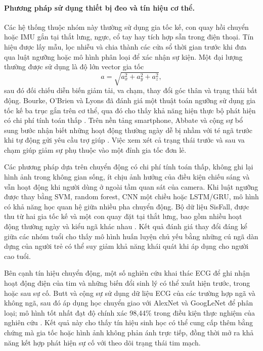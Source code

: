 \paragraph{Phương pháp sử dụng thiết bị đeo và tín hiệu cơ thể.}
Các hệ thống thuộc nhóm này thường sử dụng gia tốc kế, con quay hồi chuyển hoặc IMU gắn tại thắt lưng, ngực, cổ tay hay tích hợp sẵn trong điện thoại. Tín hiệu được lấy mẫu, lọc nhiễu và chia thành các cửa sổ thời gian trước khi đưa qua luật ngưỡng hoặc mô hình phân loại để xác nhận sự kiện. Một đại lượng thường được sử dụng là độ lớn vector gia tốc
\begin{equation}
a=\sqrt{a_x^2+a_y^2+a_z^2},
\end{equation}
sau đó đối chiếu diễn biến giảm tải, va chạm, thay đổi góc thân và trạng thái bất động. Bourke, O'Brien và Lyons đã đánh giá một thuật toán ngưỡng sử dụng gia tốc kế ba trục gắn trên cơ thể, qua đó cho thấy khả năng hiện thực bộ phát hiện có chi phí tính toán thấp . Trên nền tảng smartphone, Abbate và cộng sự bổ sung bước nhận biết những hoạt động thường ngày dễ bị nhầm với té ngã trước khi tự động gửi yêu cầu trợ giúp . Việc xem xét cả trạng thái trước và sau va chạm giúp giảm sự phụ thuộc vào một đỉnh gia tốc đơn lẻ.

Các phương pháp dựa trên chuyển động có chi phí tính toán thấp, không ghi lại hình ảnh trong không gian sống, ít chịu ảnh hưởng của điều kiện chiếu sáng và vẫn hoạt động khi người dùng ở ngoài tầm quan sát của camera. Khi luật ngưỡng được thay bằng SVM, random forest, CNN một chiều hoặc LSTM/GRU, mô hình có khả năng học quan hệ giữa nhiều pha chuyển động. Bộ dữ liệu SisFall, được thu từ hai gia tốc kế và một con quay đặt tại thắt lưng, bao gồm nhiều hoạt động thường ngày và kiểu ngã khác nhau . Kết quả đánh giá thay đổi đáng kể giữa các nhóm tuổi cho thấy mô hình huấn luyện chủ yếu bằng những cú ngã dàn dựng của người trẻ có thể suy giảm khả năng khái quát khi áp dụng cho người cao tuổi.

Bên cạnh tín hiệu chuyển động, một số nghiên cứu khai thác ECG để ghi nhận hoạt động điện của tim và những biến đổi sinh lý có thể xuất hiện trước, trong hoặc sau sự cố. Butt và cộng sự sử dụng dữ liệu ECG của các trường hợp ngã và không ngã, sau đó áp dụng học chuyển giao với AlexNet và GoogLeNet để phân loại; mô hình tốt nhất đạt độ chính xác 98,44\% trong điều kiện thực nghiệm của nghiên cứu . Kết quả này cho thấy tín hiệu sinh học có thể cung cấp thêm bằng chứng mà gia tốc hoặc hình ảnh không phản ánh trực tiếp, đồng thời mở ra khả năng kết hợp phát hiện sự cố với theo dõi trạng thái tim mạch.

